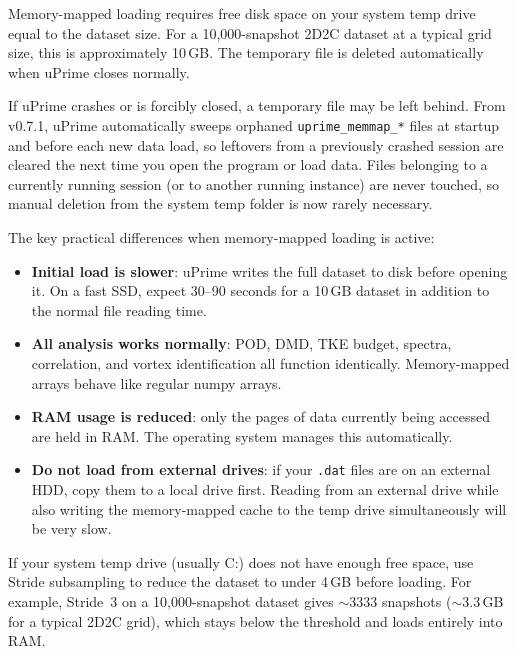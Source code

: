 \documentclass[11pt, a4paper]{report}
\newcommand{\software}[1]{\textsf{#1}}
\begin{document}
\begin{notebox}
Memory-mapped loading requires free disk space on your system temp drive equal to the dataset size. For a 10,000-snapshot 2D2C dataset at a typical grid size, this is approximately 10\,GB. The temporary file is deleted automatically when \software{uPrime} closes normally.
\end{notebox}

\begin{warnbox}
If \software{uPrime} crashes or is forcibly closed, a temporary file may be left behind. From v0.7.1, \software{uPrime} automatically sweeps orphaned \texttt{uprime\_memmap\_*} files at startup and before each new data load, so leftovers from a previously crashed session are cleared the next time you open the program or load data. Files belonging to a currently running session (or to another running instance) are never touched, so manual deletion from the system temp folder is now rarely necessary.
\end{warnbox}

The key practical differences when memory-mapped loading is active:

\begin{itemize}[leftmargin=1.5em]
  \item \textbf{Initial load is slower}: \software{uPrime} writes the full dataset to disk before opening it. On a fast SSD, expect 30--90 seconds for a 10\,GB dataset in addition to the normal file reading time.
  \item \textbf{All analysis works normally}: POD, DMD, TKE budget, spectra, correlation, and vortex identification all function identically. Memory-mapped arrays behave like regular numpy arrays.
  \item \textbf{RAM usage is reduced}: only the pages of data currently being accessed are held in RAM. The operating system manages this automatically.
  \item \textbf{Do not load from external drives}: if your \texttt{.dat} files are on an external HDD, copy them to a local drive first. Reading from an external drive while also writing the memory-mapped cache to the temp drive simultaneously will be very slow.
\end{itemize}

\begin{tipbox}
If your system temp drive (usually C:) does not have enough free space, use Stride subsampling to reduce the dataset to under 4\,GB before loading. For example, Stride~3 on a 10,000-snapshot dataset gives $\sim$3333 snapshots ($\sim$3.3\,GB for a typical 2D2C grid), which stays below the threshold and loads entirely into RAM.
\end{tipbox}
\end{document}
